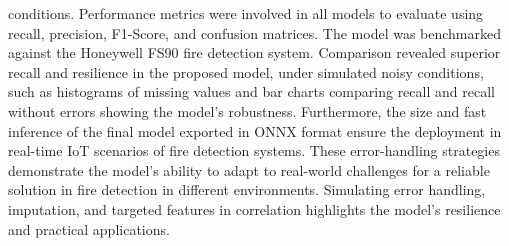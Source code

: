 \documentclass[conference]{IEEEtran}
\begin{document}
conditions. Performance metrics were involved in all models
to evaluate using recall, precision, F1-Score, and confusion
matrices. The model was benchmarked against the Honeywell
FS90 fire detection system. Comparison revealed superior
recall and resilience in the proposed model, under simulated
noisy conditions, such as histograms of missing values and
bar charts comparing recall and recall without errors
showing the model's robustness. Furthermore, the size and
fast inference of the final model exported in ONNX format
ensure the deployment in real-time IoT scenarios of fire
detection systems. These error-handling strategies
demonstrate the model's ability to adapt to real-world
challenges for a reliable solution in fire detection in
different environments. Simulating error handling,
imputation, and targeted features in correlation highlights
the model's resilience and practical applications. 
\end{document}
